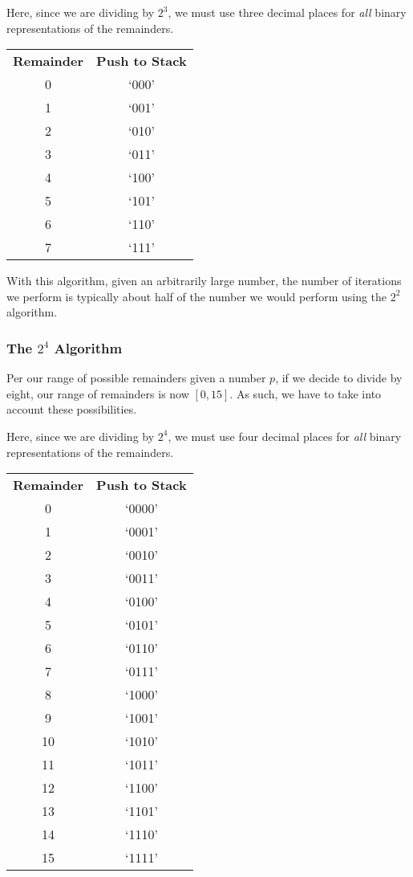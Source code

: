 \documentclass[12pt]{article}
\begin{document}
\par Here, since we are dividing by $2^3$, we must use three decimal places for \textit{all} binary representations of the remainders.

\begin{center}
  \begin{tabular}{c|c}
    \textbf{Remainder} & \textbf{Push to Stack} \\
    0 & `000' \\
    1 & `001' \\
    2 & `010' \\
    3 & `011' \\
    4 & `100' \\
    5 & `101' \\
    6 & `110' \\
    7 & `111'
  \end{tabular}
\end{center}

\par With this algorithm, given an arbitrarily large number, the number of iterations we perform is typically about half of the number we would perform using the $2^2$ algorithm.

\subsubsection{The $2^4$ Algorithm}
Per our range of possible remainders given a number $p$, if we decide to divide by eight, our range of remainders is now $[0,15]$. As such, we have to take into account these possibilities.

\par Here, since we are dividing by $2^4$, we must use four decimal places for \textit{all} binary representations of the remainders.

\begin{center}
  \begin{tabular}{c|c}
    \textbf{Remainder} & \textbf{Push to Stack} \\
    0 & `0000' \\
    1 & `0001' \\
    2 & `0010' \\
    3 & `0011' \\
    4 & `0100' \\
    5 & `0101' \\
    6 & `0110' \\
    7 & `0111' \\
    8 & `1000' \\
    9 & `1001' \\
    10 & `1010' \\
    11 & `1011' \\
    12 & `1100' \\
    13 & `1101' \\
    14 & `1110' \\
    15 & `1111'
  \end{tabular}
\end{center}
\end{document}
